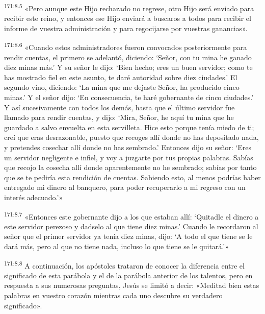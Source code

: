 \par 
\textsuperscript{171:8.5} «Pero aunque este Hijo rechazado no regrese, otro Hijo será enviado para recibir este reino, y entonces ese Hijo enviará a buscaros a todos para recibir el informe de vuestra administración y para regocijarse por vuestras ganancias».

\par 
\textsuperscript{171:8.6} «Cuando estos administradores fueron convocados posteriormente para rendir cuentas, el primero se adelantó, diciendo: `Señor, con tu mina he ganado diez minas más.' Y su señor le dijo: `Bien hecho; eres un buen servidor; como te has mostrado fiel en este asunto, te daré autoridad sobre diez ciudades.' El segundo vino, diciendo: `La mina que me dejaste Señor, ha producido cinco minas.' Y el señor dijo: `En consecuencia, te haré gobernante de cinco ciudades.' Y así sucesivamente con todos los demás, hasta que el último servidor fue llamado para rendir cuentas, y dijo: `Mira, Señor, he aquí tu mina que he guardado a salvo envuelta en esta servilleta. Hice esto porque tenía miedo de ti; creí que eras desrazonable, puesto que recoges allí donde no has depositado nada, y pretendes cosechar allí donde no has sembrado.' Entonces dijo su señor: `Eres un servidor negligente e infiel, y voy a juzgarte por tus propias palabras. Sabías que recojo la cosecha allí donde aparentemente no he sembrado; sabías por tanto que se te pediría esta rendición de cuentas. Sabiendo esto, al menos podrías haber entregado mi dinero al banquero, para poder recuperarlo a mi regreso con un interés adecuado.'»

\par 
\textsuperscript{171:8.7} «Entonces este gobernante dijo a los que estaban allí: `Quitadle el dinero a este servidor perezoso y dadselo al que tiene diez minas.' Cuando le recordaron al señor que el primer servidor ya tenía diez minas, dijo: `A todo el que tiene se le dará más, pero al que no tiene nada, incluso lo que tiene se le quitará.'»

\par 
\textsuperscript{171:8.8} A continuación, los apóstoles trataron de conocer la diferencia entre el significado de esta parábola y el de la parábola anterior de los talentos, pero en respuesta a sus numerosas preguntas, Jesús se limitó a decir: «Meditad bien estas palabras en vuestro corazón mientras cada uno descubre su verdadero significado».

